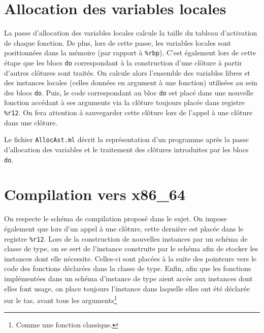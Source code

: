 \documentclass[french, 12pt]{article}
\begin{document}
\section*{Allocation des variables locales}
La passe d'allocation des variables locales calcule la taille du tableau
d'activation de chaque fonction. De plus, lors de cette passe, les variables
locales sont positionnées dans la mémoire (par rapport à \texttt{\%rbp}). C'est
également lors de cette étape que les blocs \texttt{do} correspondant à la
construction d'une clôture à partir d'autres clôtures sont traités. On calcule
alors l'ensemble des variables libres et des instances locales (celles données
en argument à une fonction) utilisées au sein des blocs \texttt{do}. Puis,
le code correspondant au bloc \texttt{do} est placé dans une nouvelle fonction
accédant à ses arguments via la clôture toujours placée dans registre
\texttt{\%r12}. On fera attention à sauvegarder cette clôture lors de l'appel à
une clôture dans une clôture.

Le fichier \texttt{AllocAst.ml} décrit la représentation d'un programme après
la passe d'allocation des variables et le traitement des clôtures introduites
par les blocs \texttt{do}.

\section*{Compilation vers x86\_64}
On respecte le schéma de compilation proposé dans le sujet. On impose également
que lors d'un appel à une clôture, cette dernière est placée dans le registre
\texttt{\%r12}. Lors de la construction de nouvelles instances par un schéma de
classe de type, on se sert de l'instance construite par le schéma afin de
stocker les instances dont elle nécessite. Celles-ci sont placées à la suite des
pointeurs vers le code des fonctions déclarées dans la classe de type. Enfin,
afin que les fonctions implémentées dans un schéma d'instance de type aient
accès aux instances dont elles font usage, on place toujours l'instance dans
laquelle elles ont été déclarée sur le tas, avant tous les arguments\footnote{
    Comme une fonction classique.}
\end{document}
